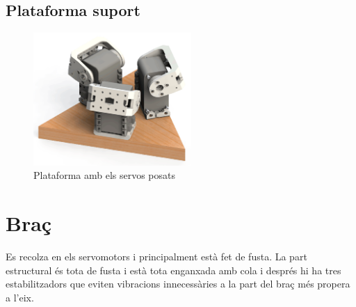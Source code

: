 \documentclass[a4paper, 12pt]{article}
\begin{document}
\subsection{Plataforma suport}
\begin{figure}[h!]
\begin{minipage}[b]{0.45\linewidth}
\centering
\includegraphics[width=6cm]{./imgComp/plataforma}
\caption{Plataforma amb els servos posats}
\end{minipage}
\end{figure}

\newpage
\section{Braç}
Es recolza en els servomotors i principalment està fet de fusta. La part estructural és tota de fusta i està tota enganxada amb cola i després hi ha tres estabilitzadors que eviten vibracions innecessàries a la part del braç més propera a l'eix. 
\end{document}
